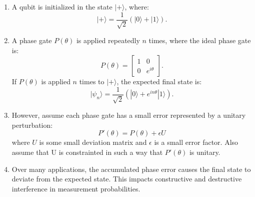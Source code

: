 \documentclass[12pt]{article}
\begin{document}
\begin{enumerate}
    \item A qubit is initialized in the state \( |+\rangle \), where:
    \[
    |+\rangle = \frac{1}{\sqrt{2}} (|0\rangle + |1\rangle).
    \]
    \item A phase gate \( P(\theta) \) is applied repeatedly \( n \) times, where the ideal phase gate is:
    \[
    P(\theta) = \begin{bmatrix} 1 & 0 \\ 0 & e^{i\theta} \end{bmatrix}.
    \]
    If \( P(\theta) \) is applied \( n \) times to \( |+\rangle \), the expected final state is:
    \[
    |\psi_n\rangle = \frac{1}{\sqrt{2}} (|0\rangle + e^{in\theta} |1\rangle).
    \]
    \item However, assume each phase gate has a small error represented by a unitary perturbation:
    \[
    P'(\theta) = P(\theta) + \epsilon U
    \]
    where \( U \) is some small deviation matrix and \( \epsilon \) is a small error factor. Also assume that U is constrainted in such a way that $P'(\theta)$ is unitary.
    \item Over many applications, the accumulated phase error causes the final state to deviate from the expected state. This impacts constructive and destructive interference in measurement probabilities.
\end{enumerate}
\end{document}
